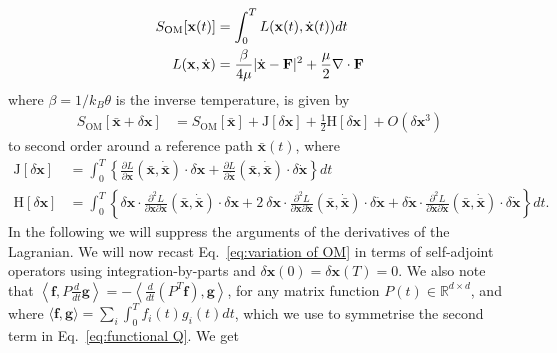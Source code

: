 \begin{align}
S_{\text{OM}}[\mathbf{x}(t)] & =\int_{0}^{T}L(\mathbf{x}(t),\dot{\mathbf{x}}(t))dt\label{eq:onsager-machlup action}\\
L(\mathbf{x},\dot{\mathbf{x}}) & =\frac{\beta}{4\mu}|\dot{{\bf x}}-\mathbf{F}|^{2}+\frac{\mu}{2}\nabla\cdot\mathbf{F}\nonumber 
\end{align}
where $\beta=1/k_{B}\theta$ is the inverse temperature, is given
by
\begin{align}
S_{\text{OM}}[\mathbf{\mathbf{\bar{\mathbf{x}}}}+\delta\mathbf{x}] & =S_{\text{OM}}[\mathbf{\mathbf{\bar{\mathbf{x}}}}]+\mathrm{J}[\delta\mathbf{x}]+\frac{1}{2}\mathrm{H}[\delta\mathbf{x}]+O(\delta\mathbf{x}^{3})\label{eq:variation of OM}
\end{align}
to second order around a reference path $\mathbf{\bar{\mathbf{x}}}(t)$,
where
\begin{align}
\mathrm{J}[\delta\mathbf{x}] & =\int_{0}^{T}\left\{ \frac{\partial L}{\partial\mathbf{x}}(\mathbf{\mathbf{\bar{\mathbf{x}}}},\dot{\mathbf{\mathbf{\bar{\mathbf{x}}}}})\cdot\delta\mathbf{x}+\frac{\partial L}{\partial\dot{\mathbf{x}}}(\mathbf{\mathbf{\bar{\mathbf{x}}}},\dot{\mathbf{\mathbf{\bar{\mathbf{x}}}}})\cdot\delta\dot{\mathbf{x}}\right\} dt\\
\mathrm{H}[\delta\mathbf{x}] & =\int_{0}^{T}\left\{ \delta\mathbf{x}\cdot\frac{\partial^{2}L}{\partial\mathbf{x}\partial\mathbf{x}}(\mathbf{\mathbf{\bar{\mathbf{x}}}},\dot{\mathbf{\mathbf{\bar{\mathbf{x}}}}})\cdot\delta\mathbf{x}+2\ \delta\mathbf{x}\cdot\frac{\partial^{2}L}{\partial\mathbf{x}\partial\dot{\mathbf{x}}}(\mathbf{\mathbf{\bar{\mathbf{x}}}},\dot{\mathbf{\mathbf{\bar{\mathbf{x}}}}})\cdot\delta\dot{\mathbf{x}}+\delta\dot{\mathbf{x}}\cdot\frac{\partial^{2}L}{\partial\dot{\mathbf{x}}\partial\dot{\mathbf{x}}}(\mathbf{\mathbf{\bar{\mathbf{x}}}},\dot{\mathbf{\mathbf{\bar{\mathbf{x}}}}})\cdot\delta\dot{\mathbf{x}}\right\} dt.\label{eq:functional Q}
\end{align}
In the following we will suppress the arguments of the derivatives
of the Lagranian. We will now recast Eq.~\eqref{eq:variation of OM}
in terms of self-adjoint operators using integration-by-parts and
$\delta\mathbf{x}(0)=\delta\mathbf{x}(T)=0$. We also note that $\left\langle \mathbf{f},P\frac{d}{dt}\mathbf{g}\right\rangle =-\left\langle \frac{d}{dt}\left(P^{T}\mathbf{f}\right),\mathbf{g}\right\rangle $,
for any matrix function $P(t)\in\mathbb{R}^{d\times d}$, and where
$\langle\mathbf{f},\mathbf{g}\rangle=\sum_{i}\int_{0}^{T}f_{i}(t)g_{i}(t)dt$,
which we use to symmetrise the second term in Eq.~\eqref{eq:functional Q}.
We get

